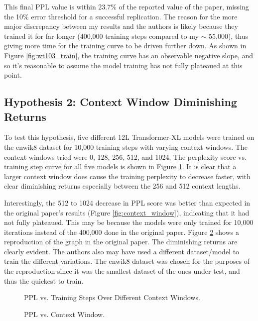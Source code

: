 \documentclass[11pt]{article}
\begin{document}
This final PPL value is within 23.7\% of the reported value of the paper, missing the 10\% error threshold for a successful replication. The reason for the more major discrepancy between my results and the authors is likely because they trained it for far longer (400,000 training steps compared to my $\sim$ 55,000), thus giving more time for the training curve to be driven further down. As shown in Figure \ref{fig:wt103_train}, the training curve has an observable negative slope, and so it's reasonable to assume the model training has not fully plateaued at this point.

\subsection{Hypothesis 2: Context Window Diminishing Returns}

To test this hypothesis, five different 12L Transformer-XL models were trained on the enwik8 dataset for 10,000 training steps with varying context windows. The context windows tried were 0, 128, 256, 512, and 1024. The perplexity score vs. training step curve for all five models is shown in Figure \ref{fig:enwik8_context_length_experiments}. It is clear that a larger context window does cause the training perplexity to decrease faster, with clear diminishing returns especially between the 256 and 512 context lengths. 

Interestingly, the 512 to 1024 decrease in PPL score was better than expected in the original paper's results (Figure \ref{fig:context_window}), indicating that it had not fully plateaued. This may be because the models were only trained for 10,000 iterations instead of the 400,000 done in the original paper. Figure \ref{fig:ppl_vs_context_window} shows a reproduction of the graph in the original paper. The diminishing returns are clearly evident. The authors also may have used a different dataset/model to train the different variations. The enwik8 dataset was chosen for the purposes of the reproduction since it was the smallest dataset of the ones under test, and thus the quickest to train.

\begin{figure}[!htbp]
\centering

\caption{PPL vs. Training Steps Over Different Context Windows.}
\label{fig:enwik8_context_length_experiments}
\end{figure}

\begin{figure}[!htbp]
\centering

\caption{PPL vs. Context Window.}
\label{fig:ppl_vs_context_window}
\end{figure}
\end{document}
